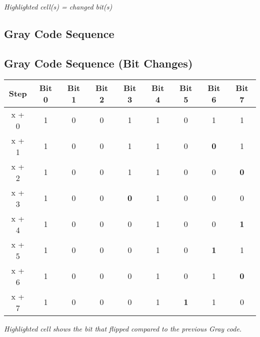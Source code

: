 \emph{Highlighted cell(s) = changed bit(s)}


\bigskip

\subsection*{Gray Code Sequence}
\subsection*{Gray Code Sequence (Bit Changes)}

\begin{tabular}{|c|*8{c|}}
\hline
Step &  Bit 0 &  Bit 1 &  Bit 2 &  Bit 3 &  Bit 4 &  Bit 5 &  Bit 6 &  Bit 7   \\
\hline
x + 0 &
    1
&    0
&    0
&    1
&    1
&    0
&    1
&    1
 \\
\hline
x + 1 &
    1
&    0
&    0
&    1
&    1
&    0
&    \cellcolor{yellow}\textbf{ 0 }
&    1
 \\
\hline
x + 2 &
    1
&    0
&    0
&    1
&    1
&    0
&    0
&    \cellcolor{yellow}\textbf{ 0 }
 \\
\hline
x + 3 &
    1
&    0
&    0
&    \cellcolor{yellow}\textbf{ 0 }
&    1
&    0
&    0
&    0
 \\
\hline
x + 4 &
    1
&    0
&    0
&    0
&    1
&    0
&    0
&    \cellcolor{yellow}\textbf{ 1 }
 \\
\hline
x + 5 &
    1
&    0
&    0
&    0
&    1
&    0
&    \cellcolor{yellow}\textbf{ 1 }
&    1
 \\
\hline
x + 6 &
    1
&    0
&    0
&    0
&    1
&    0
&    1
&    \cellcolor{yellow}\textbf{ 0 }
 \\
\hline
x + 7 &
    1
&    0
&    0
&    0
&    1
&    \cellcolor{yellow}\textbf{ 1 }
&    1
&    0
 \\
\hline
\end{tabular}

\emph{Highlighted cell shows the bit that flipped compared to the previous Gray code.}



\pagebreak